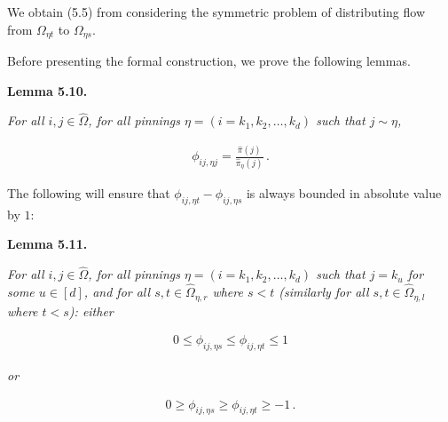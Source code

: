 We obtain (5.5) from considering the symmetric problem of distributing flow from $\Omega_{\eta t}$ to $\Omega_{\eta s}$.\par




Before presenting the formal construction, we prove the following lemmas.\par





\par\medskip\noindent\textbf{\textbf{Lemma 5.10}\textbf{.}}\par



\emph{For all $i,j\in\hat{\Omega}$, for all pinnings $\eta=(i=k_{1},k_{2},\dots,k_{d})$ such that $j\sim\eta$,}\par


\[\begin{gathered}
\phi_{ij,\eta j}=\frac{\hat{\pi}(j)}{\hat{\pi}_{\eta}(j)}\,.
\end{gathered}\]






The following will ensure that $\phi_{ij,\eta t}-\phi_{ij,\eta s}$ is always bounded in absolute value by $1$:\par





\par\medskip\noindent\textbf{\textbf{Lemma 5.11}\textbf{.}}\par



\emph{For all $i,j\in\hat{\Omega}$, for all pinnings $\eta=(i=k_{1},k_{2},\dots,k_{d})$ such that $j=k_{u}$ for some $u\in[d]$, and for all $s,t\in\hat{\Omega}_{\eta,r}$ where $s<t$ (similarly for all $s,t\in\hat{\Omega}_{\eta,l}$ where $t<s$):
either}\par


\[\begin{gathered}
0\leq\phi_{ij,\eta s}\leq\phi_{ij,\eta t}\leq 1
\end{gathered}\]


\emph{or}\par


\[\begin{gathered}
0\geq\phi_{ij,\eta s}\geq\phi_{ij,\eta t}\geq-1\,.
\end{gathered}\]



